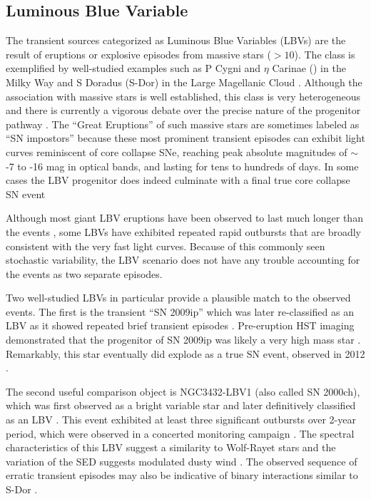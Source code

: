 \subsection{Luminous Blue Variable}

The transient sources categorized as Luminous Blue Variables (LBVs)
are the result of eruptions or explosive episodes from massive stars
($>10$\Msun).  The class is exemplified by well-studied examples such
as P Cygni and $\eta$ Carinae (\etacar) in the Milky Way and S Doradus
(S-Dor) in the Large Magellanic Cloud \citep[for recent overviews of
  the LBV class, see][]{Smith:2011b, Kochanek:2012}.  Although the
association with massive stars is well established, this class is very
heterogeneous and there is currently a vigorous debate over the
precise nature of the progenitor pathway
\citep{Smith:2015,Humphreys:2016,Smith:2016}.  The ``Great Eruptions''
of such massive stars are sometimes labeled as ``SN impostors''
because these most prominent transient episodes can exhibit light
curves reminiscent of core collapse SNe, reaching peak absolute
magnitudes of $\sim$-7 to -16 mag in optical bands, and lasting for
tens to hundreds of days.  In some cases the LBV progenitor does
indeed culminate with a final true core collapse SN event
\citep[e.g.]{Mauerhan:2013, Tartaglia:2016}

Although most giant LBV eruptions have been observed to last much
longer than the \spock events \citep{Smith:2011b}, some LBVs have
exhibited repeated rapid outbursts that are broadly consistent with
the very fast \spock light curves. Because of this commonly seen
stochastic variability, the LBV scenario does not have any trouble
accounting for the \spock events as two separate episodes.

Two well-studied LBVs in particular provide a plausible match to the
observed \spock events.  The first is the transient ``SN 2009ip''
\citep{Maza:2009} which was later re-classified as an LBV as it showed
repeated brief transient episodes \citep[e.g.,][]{Miller:2009,
  Li:2009, Berger:2009, Drake:2010}. Pre-eruption HST imaging
demonstrated that the progenitor of SN 2009ip was likely a very high
mass star \citep[$\gtrsim50$ \Msun,][]{Smith:2010, Foley:2011}.
Remarkably, this star eventually did explode as a true SN event,
observed in 2012 \citep{Mauerhan:2013, Pastorello:2013, Prieto:2013}.

The second useful comparison object is NGC3432-LBV1 (also called SN
2000ch), which was first observed as a bright variable star
\citep{Papenkova:2000} and later definitively classified as an LBV
\citep{Wagner:2004}.  This event exhibited at least three significant
outbursts over 2-year period, which were observed in a concerted
monitoring campaign \citep{Pastorello:2010}.  The spectral
characteristics of this LBV suggest a similarity to Wolf-Rayet stars
\citep{Pastorello:2010} and the variation of the SED suggests
modulated dusty wind \citep{Wagner:2004, Kochanek:2012}. The observed
sequence of erratic transient episodes may also be indicative of
binary interactions similar to S-Dor
\citep{Pastorello:2010, Smith:2011b}.

